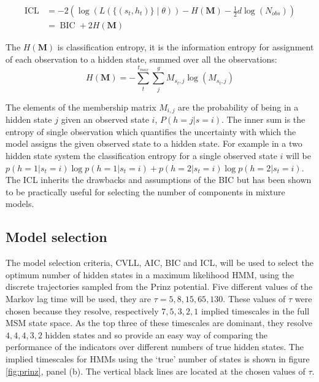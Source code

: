 \begin{equation}\label{eqn:icl}
\begin{split}
        \operatorname{ICL} &= -2\left(\log{\left(L\left(\{(s_t, h_{t})\}\middle|\theta\right)\right)} - H\left(\mathbf{M}\right) - \frac{1}{2}d\log{\left(N_{obs}\right)}\right)     \\
        & = \operatorname{BIC} + 2H\left(\mathbf{M}\right)
\end{split}
\end{equation}

The $H\left(\mathbf{M}\right)$ is classification entropy, it is  the information entropy for assignment of each observation to a hidden state, summed over all the observations: 
\begin{equation}
    H(\mathbf{M}) = -\sum_{t}^{t_{max}} \sum_{j}^{g} M_{s_{t}, j}\log{\left(M_{s_{t}, j}\right)}
\end{equation}

The elements of the membership matrix  $M_{i,j}$ are the probability of being in a hidden state $j$ given an observed state $i$, $P(h=j|s=i)$. The inner sum is the entropy of single observation which quantifies the uncertainty with which the model assigns the given observed state to a hidden state. For example in a two hidden state system the classification entropy for a single observed state $i$ will be $p(h=1|s_t=i)\log{p(h=1|s_t=i)} + p(h=2|s_t=i)\log{p(h=2|s_t=i)}$. The ICL inherits the drawbacks and assumptions of the BIC but has been shown to be practically useful for selecting the number of components in mixture models. 


\subsection{Model selection}

The model selection criteria, CVLL, AIC, BIC and ICL, will be used to select the optimum number of hidden states in a maximum likelihood HMM, using the discrete trajectories sampled from the Prinz potential. Five different values of the Markov lag time will be used, they are $\tau=5, 8, 15, 65, 130$. These values of $\tau$ were chosen because they resolve, respectively $7, 5, 3, 2, 1$ implied timescales in the full MSM state space. As the top three of these timescales are dominant, they resolve $4, 4, 4, 3, 2$ hidden states and so provide an easy way of comparing the performance of the indicators over different numbers of true hidden states\cite{noeProjectedHiddenMarkov2013a}. The implied timescales for HMMs using the `true' number of states is shown in figure \ref{fig:prinz}, panel (b). The vertical black lines are located at the chosen values of $\tau$.

